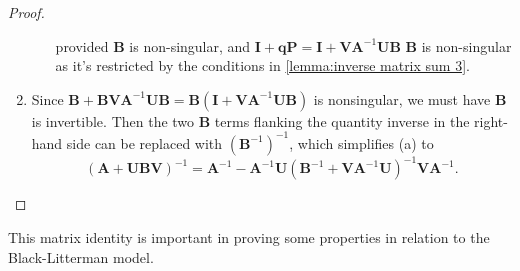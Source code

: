 \documentclass[13pt]{article}
\theoremstyle{definition}
\theoremstyle{remark}
\newenvironment{remark}
  {\pushQED{\qed}\renewcommand{\qedsymbol}{$\triangle$}\remarkx}
  {\popQED\endremarkx}
\begin{document}
\begin{proof}
\begin{enumerate}[label=(\alph*)]
\begin{enumerate}[label=(\roman*)]
\[        \]
        provided $\mathbf{B}$ is non-singular, and $\mathbf{\mathbf{I}}+\bm{q}\mathbf{\mathbf{P}}=\mathbf{\mathbf{I}}+\mathbf{\mathbf{V} \mathbf{A}}^{-1}\mathbf{U}\mathbf{B}$ $\mathbf{B}$ is non-singular as it's restricted by the conditions in \cref{lemma:inverse matrix sum 3}.
        \end{enumerate}
        \item Since $\mathbf{\mathbf{B}}+\mathbf{\mathbf{B} \mathbf{V} \mathbf{A}}^{-1} \mathbf{U \mathbf{B}} = \mathbf{B} (\mathbf{\mathbf{I}}+\mathbf{\mathbf{V} \mathbf{A}}^{-1} \mathbf{U \mathbf{B}})$ is nonsingular, we must have  {\color{C6}$\mathbf{\mathbf{B}}$ is invertible}. Then the two $\mathbf{\mathbf{B}}$ terms flanking the quantity inverse in the right-hand side can be replaced with $\left(\mathbf{\mathbf{B}}^{-1}\right)^{-1}$, which simplifies (a) to
        $$
        (\mathbf{\mathbf{A}}+\mathbf{U \mathbf{B} \mathbf{V}})^{-1}=\mathbf{\mathbf{A}}^{-1}-\mathbf{\mathbf{A}}^{-1} \mathbf{U}\left(\mathbf{\mathbf{B}}^{-1}+\mathbf{\mathbf{V} \mathbf{A}}^{-1} \mathbf{U}\right)^{-1} \mathbf{\mathbf{V} \mathbf{A}}^{-1} .
        $$
    \end{enumerate}
\end{proof}

\begin{remark}
    This matrix identity is important in proving some properties in relation to the Black-Litterman model.
\end{remark}
\end{document}
